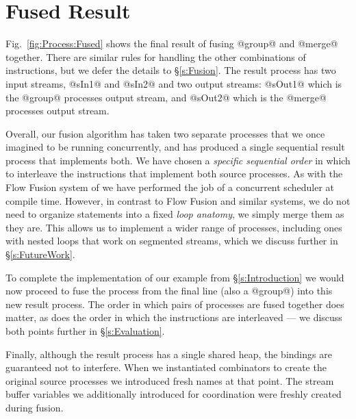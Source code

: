 \section{Fused Result}

Fig.~\ref{fig:Process:Fused} shows the final result of fusing @group@ and @merge@ together. There are similar rules for handling the other combinations of instructions, but we defer the details to \S\ref{s:Fusion}. The result process has two input streams, @sIn1@ and @sIn2@ and two output streams: @sOut1@ which is the @group@ processes output stream, and @sOut2@ which is the @merge@ processes output stream. 

Overall, our fusion algorithm has taken two separate processes that we once imagined to be running concurrently, and has produced a single sequential result process that implements both. We have chosen a \emph{specific sequential order} in which to interleave the instructions that implement both source processes. As with the Flow Fusion system of \citet{lippmeier2013data} we have performed the job of a concurrent scheduler at compile time. However, in contrast to Flow Fusion and similar systems, we do not need to organize statements into a fixed \emph{loop anatomy}, we simply merge them as they are. This allows us to implement a wider range of processes, including ones with nested loops that work on segmented streams, which we discuss further in \S\ref{s:FutureWork}. 

To complete the implementation of our example from \S\ref{s:Introduction} we would now proceed to fuse the process from the final line (also a @group@) into this new result process. The order in which pairs of processes are fused together does matter, as does the order in which the instructions are interleaved --- we discuss both points further in \S\ref{s:Evaluation}.

Finally, although the result process has a single shared heap, the bindings are guaranteed not to interfere. When we instantiated combinators to create the original source processes we introduced fresh names at that point. The stream buffer variables we additionally introduced for coordination were freshly created during fusion.

